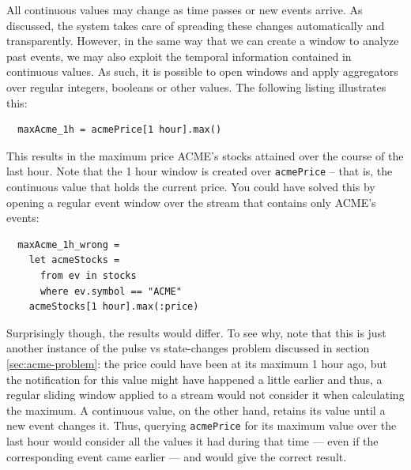 All continuous values may change as time passes or new events
arrive. As discussed, the system takes care of spreading these changes
automatically and transparently. However, in the same way that we can
create a window to analyze past events, we may also exploit the
temporal information contained in continuous values. As such, it is
possible to open windows and apply aggregators over regular integers,
booleans or other values. The following listing illustrates this:

\begin{lstlisting}
  maxAcme_1h = acmePrice[1 hour].max()
\end{lstlisting}

This results in the maximum price ACME's stocks attained over the
course of the last hour. Note that the 1 hour window is created over
\verb=acmePrice= -- that is, the continuous value that holds the
current price. You could have solved this by opening a regular event
window over the stream that contains only ACME's events:

\begin{lstlisting}
  maxAcme_1h_wrong =
    let acmeStocks =
      from ev in stocks
      where ev.symbol == "ACME"
    acmeStocks[1 hour].max(:price)
\end{lstlisting}

Surprisingly though, the results would differ. To see why, note that
this is just another instance of the pulse vs state-changes problem
discussed in section \ref{sec:acme-problem}: the price could have been
at its maximum 1 hour ago, but the notification for this value might
have happened a little earlier and thus, a regular sliding window
applied to a stream would not consider it when calculating the
maximum. A continuous value, on the other hand, retains its value
until a new event changes it. Thus, querying \verb=acmePrice= for its
maximum value over the last hour would consider all the values it had
during that time --- even if the corresponding event came earlier ---
and would give the correct result.

